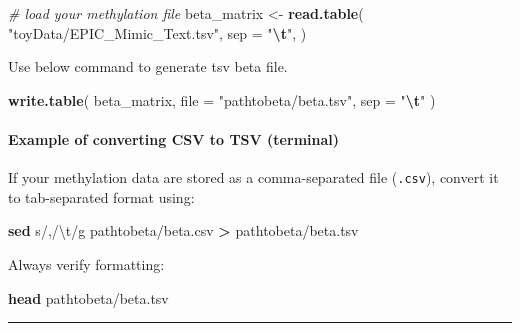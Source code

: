 \documentclass[
]{article}
\newenvironment{Shaded}{\begin{snugshade}}{\end{snugshade}}
\newcommand{\AttributeTok}[1]{\textcolor[rgb]{0.13,0.29,0.53}{#1}}
\newcommand{\CommentTok}[1]{\textcolor[rgb]{0.56,0.35,0.01}{\textit{#1}}}
\newcommand{\FunctionTok}[1]{\textcolor[rgb]{0.13,0.29,0.53}{\textbf{#1}}}
\newcommand{\NormalTok}[1]{#1}
\newcommand{\OperatorTok}[1]{\textcolor[rgb]{0.81,0.36,0.00}{\textbf{#1}}}
\newcommand{\OtherTok}[1]{\textcolor[rgb]{0.56,0.35,0.01}{#1}}
\newcommand{\SpecialCharTok}[1]{\textcolor[rgb]{0.81,0.36,0.00}{\textbf{#1}}}
\newcommand{\StringTok}[1]{\textcolor[rgb]{0.31,0.60,0.02}{#1}}
\begin{document}
\begin{Shaded}
\begin{Highlighting}[]
\CommentTok{\# load your methylation file }
\NormalTok{beta\_matrix }\OtherTok{\textless{}{-}} \FunctionTok{read.table}\NormalTok{(}
  \StringTok{"toyData/EPIC\_Mimic\_Text.tsv"}\NormalTok{,}
  \AttributeTok{sep =} \StringTok{"}\SpecialCharTok{\textbackslash{}t}\StringTok{"}\NormalTok{,}
\NormalTok{)}
\end{Highlighting}
\end{Shaded}

Use below command to generate tsv beta file.

\begin{Shaded}
\begin{Highlighting}[]
\FunctionTok{write.table}\NormalTok{(}
\NormalTok{  beta\_matrix,}
  \AttributeTok{file =} \StringTok{"pathtobeta/beta.tsv"}\NormalTok{,}
  \AttributeTok{sep =} \StringTok{"}\SpecialCharTok{\textbackslash{}t}\StringTok{"}
\NormalTok{)}
\end{Highlighting}
\end{Shaded}

\paragraph{Example of converting CSV to TSV
(terminal)}\label{example-of-converting-csv-to-tsv-terminal}

If your methylation data are stored as a comma-separated file
(\texttt{.csv}), convert it to tab-separated format using:

\begin{Shaded}
\begin{Highlighting}[]
\FunctionTok{sed} \StringTok{\textquotesingle{}s/,/\textbackslash{}t/g\textquotesingle{}}\NormalTok{ pathtobeta/beta.csv }\OperatorTok{\textgreater{}}\NormalTok{ pathtobeta/beta.tsv}
\end{Highlighting}
\end{Shaded}

Always verify formatting:

\begin{Shaded}
\begin{Highlighting}[]
\FunctionTok{head}\NormalTok{ pathtobeta/beta.tsv}
\end{Highlighting}
\end{Shaded}

\begin{center}\rule{0.5\linewidth}{0.5pt}\end{center}
\end{document}
